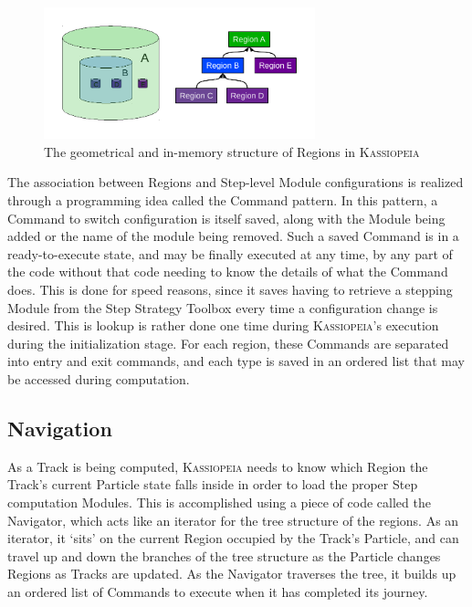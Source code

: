 \begin{figure}[!htb]
\centering
\includegraphics[width=0.7\textwidth]{images/ArchitectureFigures/ArchGeometry.pdf}
\caption{The geometrical and in-memory structure of Regions in \textsc{Kassiopeia}}
\label{archfig:geometry}
\end{figure}

The association between Regions and Step-level Module configurations is realized through a programming idea called the Command pattern.  In this pattern, a Command to switch configuration is itself saved, along with the Module being added or the name of the module being removed.  Such a saved Command is in a ready-to-execute state, and may be finally executed at any time, by any part of the code without that code needing to know the details of what the Command does.  This is done for speed reasons, since it saves having to retrieve a stepping Module from the Step Strategy Toolbox every time a configuration change is desired.  This is lookup is rather done one time during \textsc{Kassiopeia}'s execution during the initialization stage.  For each region, these Commands are separated into entry and exit commands, and each type is saved in an ordered list that may be accessed during computation.

\subsection{Navigation}

As a Track is being computed, \textsc{Kassiopeia} needs to know which Region the Track's current Particle state falls inside in order to load the proper Step computation Modules.  This is accomplished using a piece of code called the Navigator, which acts like an iterator for the tree structure of the regions.  As an iterator, it `sits' on the current Region occupied by the Track's Particle, and can travel up and down the branches of the tree structure as the Particle changes Regions as Tracks are updated.  As the Navigator traverses the tree, it builds up an ordered list of Commands to execute when it has completed its journey.

